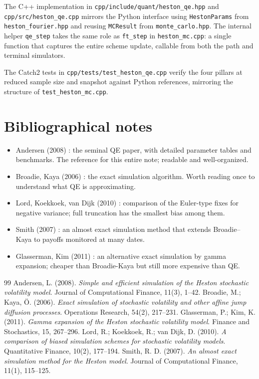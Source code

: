 \documentclass[11pt]{article}
\theoremstyle{plain}
\theoremstyle{definition}
\theoremstyle{remark}
\begin{document}
The C++ implementation in \texttt{cpp/include/quant/heston\_qe.hpp} and \texttt{cpp/src/heston\_qe.cpp} mirrors the Python interface using \texttt{HestonParams} from \texttt{heston\_fourier.hpp} and reusing \texttt{MCResult} from \texttt{monte\_carlo.hpp}. The internal helper \texttt{qe\_step} takes the same role as \texttt{ft\_step} in \texttt{heston\_mc.cpp}: a single function that captures the entire scheme update, callable from both the path and terminal simulators.

The Catch2 tests in \texttt{cpp/tests/test\_heston\_qe.cpp} verify the four pillars at reduced sample size and snapshot against Python references, mirroring the structure of \texttt{test\_heston\_mc.cpp}.

\section{Bibliographical notes}

\begin{itemize}[topsep=2pt]
    \item Andersen (2008) \cite{Andersen2008}: the seminal QE paper, with detailed parameter tables and benchmarks. The reference for this entire note; readable and well-organized.
    \item Broadie, Kaya (2006) \cite{BroadieKaya2006}: the exact simulation algorithm. Worth reading once to understand what QE is approximating.
    \item Lord, Koekkoek, van Dijk (2010) \cite{LKvD2010}: comparison of the Euler-type fixes for negative variance; full truncation has the smallest bias among them.
    \item Smith (2007) \cite{Smith2007}: an almost exact simulation method that extends Broadie--Kaya to payoffs monitored at many dates.
    \item Glasserman, Kim (2011) \cite{GlassermanKim2011}: an alternative exact simulation by gamma expansion; cheaper than Broadie-Kaya but still more expensive than QE.
\end{itemize}

\begin{thebibliography}{99}
                Andersen, L. (2008). \emph{Simple and efficient simulation of the Heston stochastic volatility model}. Journal of Computational Finance, 11(3), 1--42.
             Broadie, M.; Kaya, \"O. (2006). \emph{Exact simulation of stochastic volatility and other affine jump diffusion processes}. Operations Research, 54(2), 217--231.
           Glasserman, P.; Kim, K. (2011). \emph{Gamma expansion of the Heston stochastic volatility model}. Finance and Stochastics, 15, 267--296.
                    Lord, R.; Koekkoek, R.; van Dijk, D. (2010). \emph{A comparison of biased simulation schemes for stochastic volatility models}. Quantitative Finance, 10(2), 177--194.
                   Smith, R. D. (2007). \emph{An almost exact simulation method for the Heston model}. Journal of Computational Finance, 11(1), 115--125.
\end{thebibliography}
\end{document}
